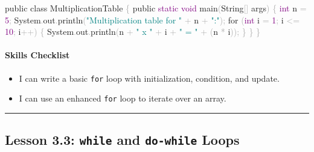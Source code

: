 \documentclass[
  justified,
  openright,
]{tufte-book}
\let\subsubsection\paragraph
\let\paragraph\paragraph
\newcommand{\BuiltInTok}[1]{#1}
\newcommand{\ControlFlowTok}[1]{\textcolor{BrandBlue}{#1}}
\newcommand{\DataTypeTok}[1]{\textcolor{Purple}{#1}}
\newcommand{\DecValTok}[1]{\textcolor{Purple}{#1}}
\newcommand{\FunctionTok}[1]{\textcolor{BrandBlue}{#1}}
\newcommand{\KeywordTok}[1]{\textcolor{BrandBlue}{#1}}
\newcommand{\NormalTok}[1]{#1}
\newcommand{\OperatorTok}[1]{\textcolor{DarkGray}{#1}}
\newcommand{\StringTok}[1]{\textcolor{Teal}{#1}}
\newenvironment{Shaded}{%
  \begin{snugshade}
}{%
  \end{snugshade}
}
\let\subsubsection\paragraph
\let\paragraph\paragraph
\providecommand{\tightlist}{%
  \setlength{\itemsep}{0pt}\setlength{\parskip}{0pt}}
\begin{document}
\begin{Shaded}
\begin{Highlighting}[]
\KeywordTok{public} \KeywordTok{class}\NormalTok{ MultiplicationTable }\OperatorTok{\{}
    \KeywordTok{public} \DataTypeTok{static} \DataTypeTok{void} \FunctionTok{main}\OperatorTok{(}\BuiltInTok{String}\OperatorTok{[]}\NormalTok{ args}\OperatorTok{)} \OperatorTok{\{}
        \DataTypeTok{int}\NormalTok{ n }\OperatorTok{=} \DecValTok{5}\OperatorTok{;}
        \BuiltInTok{System}\OperatorTok{.}\FunctionTok{out}\OperatorTok{.}\FunctionTok{println}\OperatorTok{(}\StringTok{"Multiplication table for "} \OperatorTok{+}\NormalTok{ n }\OperatorTok{+} \StringTok{":"}\OperatorTok{);}
        \ControlFlowTok{for} \OperatorTok{(}\DataTypeTok{int}\NormalTok{ i }\OperatorTok{=} \DecValTok{1}\OperatorTok{;}\NormalTok{ i }\OperatorTok{\textless{}=} \DecValTok{10}\OperatorTok{;}\NormalTok{ i}\OperatorTok{++)} \OperatorTok{\{}
            \BuiltInTok{System}\OperatorTok{.}\FunctionTok{out}\OperatorTok{.}\FunctionTok{println}\OperatorTok{(}\NormalTok{n }\OperatorTok{+} \StringTok{" x "} \OperatorTok{+}\NormalTok{ i }\OperatorTok{+} \StringTok{" = "} \OperatorTok{+} \OperatorTok{(}\NormalTok{n }\OperatorTok{*}\NormalTok{ i}\OperatorTok{));}
        \OperatorTok{\}}
    \OperatorTok{\}}
\OperatorTok{\}}
\end{Highlighting}
\end{Shaded}

\subsubsection{Skills Checklist}\label{skills-checklist-8}

\begin{itemize}
\tightlist
\item[$\square$]
  I can write a basic \texttt{for} loop with initialization, condition,
  and update.
\item[$\square$]
  I can use an enhanced \texttt{for} loop to iterate over an array.
\end{itemize}

\begin{center}\rule{0.5\linewidth}{0.5pt}\end{center}

\subsection{\texorpdfstring{Lesson 3.3: \texttt{while} and
\texttt{do-while}
Loops}{Lesson 3.3: while and do-while Loops}}\label{lesson-3.3-while-and-do-while-loops}
\end{document}
